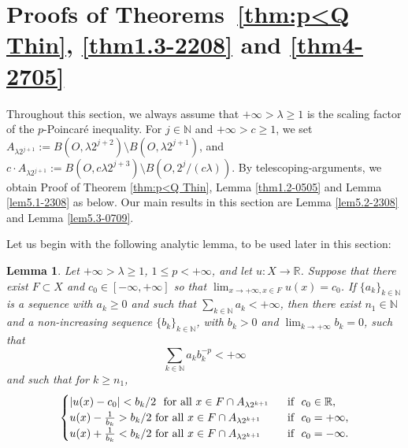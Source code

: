 \documentclass[10pt]{amsart}
\newtheorem{lemma}[theorem]{Lemma}
\numberwithin{equation}{section}
\newcommand{\N}{\mathbb{N}}
\newcommand{\R}{\mathbb{R}}
\begin{document}
\section{Proofs of Theorems~\ref{thm:p<Q Thin}, \ref{thm1.3-2208} and \ref{thm4-2705}}

Throughout this section, we always assume that $+\infty >\lambda\geq 1$ is
the scaling factor of the $p$-Poincar\'e inequality.  For $j\in\N$ and $+\infty>c\ge 1$, we set $A_{\lambda 2^{j+1}}:=B(O,\lambda2^{j+2})\setminus B(O,\lambda2^{j+1})$, and $c\cdot A_{\lambda 2^{j+1}}:=B(O,c\lambda 2^{j+3})\setminus B(O,2^{j}/(c\lambda))$. 
By telescoping-arguments, we obtain Proof of Theorem \ref{thm:p<Q Thin}, Lemma \ref{thm1.2-0505} and Lemma \ref{lem5.1-2308} as below. Our main results in this section are  Lemma \ref{lem5.2-2308} and Lemma \ref{lem5.3-0709}.

Let us begin with the following  analytic lemma, to be used later in this section:

\begin{lemma}
	\label{in-fact}Let $+\infty>\lambda\geq1$, $1\le p<{+\infty}$, and let $u:X\to\R$.  Suppose that there exist $F\subset X$ and $c_0\in[-\infty,+\infty]$ so that $\lim_{x\to+\infty,x\in F}u(x)=c_0$.  If $\{a_k\}_{k\in\N}$ is a sequence with $a_{k}\geq 0$ and such that $\sum_{k\in\mathbb N}a_k<{+\infty}$, then there exist $n_1\in\mathbb N$ and a non-increasing sequence $\{b_k\}_{k\in\mathbb N}$, with $b_k>0$ and $\lim_{k\to{+\infty}}b_k=0$, such that 
	\begin{equation}\label{eq3.1-2805}
	\sum_{k\in\mathbb N}a_kb_k^{-p}<{+\infty}
	\end{equation}
and such that for $k\geq n_1$,
	\[ \begin{cases}
	|u(x)-c_0|<b_k/2 \text{\rm \ \  for all $x\in  F\cap A_{\lambda 2^{k+1}}$} & \text{\rm \ \ if \ } c_0\in \mathbb R,\\
	\text{\rm $u(x)-\frac{1}{b_k}>b_{k}/2$ for all $x\in F\cap A_{\lambda 2^{k+1}}$} & \text{\rm \ \ if \ }c_0=+\infty,\\
	\text{\rm $u(x)+\frac{1}{b_k}<b_{k}/2$ for all $x\in F\cap A_{\lambda 2^{k+1}}$} & \text{\rm \ \ if \ }c_0=-\infty.
	\end{cases}
	\]
\end{lemma}
\end{document}
